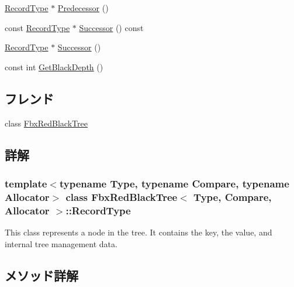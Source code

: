 \begin{DoxyCompactItemize}
\item 
\hyperlink{class_fbx_red_black_tree_1_1_record_type}{Record\+Type} $\ast$ \hyperlink{class_fbx_red_black_tree_1_1_record_type_a425843b67a7fb4cc732427f058b76860}{Predecessor} ()
\item 
const \hyperlink{class_fbx_red_black_tree_1_1_record_type}{Record\+Type} $\ast$ \hyperlink{class_fbx_red_black_tree_1_1_record_type_add6f12144b2e60f2d209d160a4c4f1aa}{Successor} () const
\item 
\hyperlink{class_fbx_red_black_tree_1_1_record_type}{Record\+Type} $\ast$ \hyperlink{class_fbx_red_black_tree_1_1_record_type_a0af352fc345ec4bfe86ba8c0c79bb337}{Successor} ()
\item 
const int \hyperlink{class_fbx_red_black_tree_1_1_record_type_aa06dd811d4dfc30acc3143ed55215b17}{Get\+Black\+Depth} ()
\end{DoxyCompactItemize}
\subsection*{フレンド}
\begin{DoxyCompactItemize}
\item 
class \hyperlink{class_fbx_red_black_tree_1_1_record_type_ad58e9ce88250221aa6b5145e8ccc237f}{Fbx\+Red\+Black\+Tree}
\end{DoxyCompactItemize}


\subsection{詳解}
\subsubsection*{template$<$typename Type, typename Compare, typename Allocator$>$\newline
class Fbx\+Red\+Black\+Tree$<$ Type, Compare, Allocator $>$\+::\+Record\+Type}

This class represents a node in the tree. It contains the key, the value, and internal tree management data. 

\subsection{メソッド詳解}
\mbox{\label{class_fbx_red_black_tree_1_1_record_type_aa06dd811d4dfc30acc3143ed55215b17}} 
